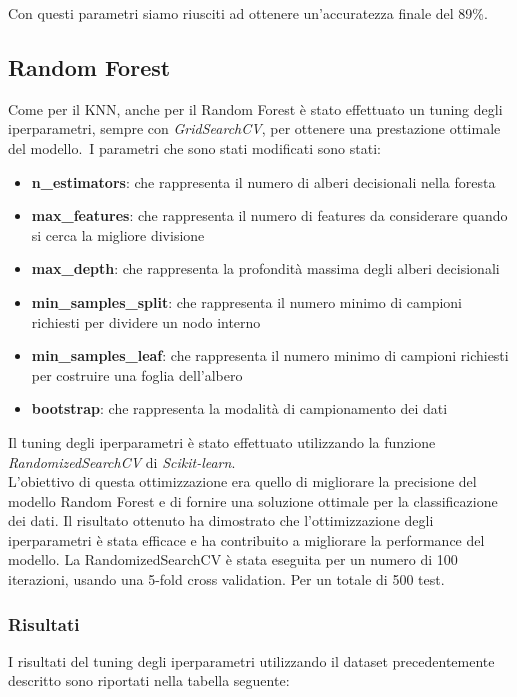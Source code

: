 \documentclass[../../Report.tex]{subfiles}
\begin{document}
Con questi parametri siamo riusciti ad ottenere un'accuratezza finale del 89\%.\\

\subsection{Random Forest}
Come per il KNN, anche per il Random Forest è stato effettuato un tuning degli iperparametri, sempre con \emph{GridSearchCV}, per ottenere una prestazione ottimale del modello.\
I parametri che sono stati modificati sono stati:
\begin{itemize}
\item \textbf{n\_estimators}: che rappresenta il numero di alberi decisionali nella foresta
\item \textbf{max\_features}: che rappresenta il numero di features da considerare quando si cerca la migliore divisione
\item \textbf{max\_depth}: che rappresenta la profondità massima degli alberi decisionali
\item \textbf{min\_samples\_split}: che rappresenta il numero minimo di campioni richiesti per dividere un nodo interno
\item \textbf{min\_samples\_leaf}: che rappresenta il numero minimo di campioni richiesti per costruire una foglia dell'albero
\item \textbf{bootstrap}: che rappresenta la modalità di campionamento dei dati
\end{itemize}
Il tuning degli iperparametri è stato effettuato utilizzando la funzione \emph{RandomizedSearchCV} di \emph{Scikit-learn}.\\
L'obiettivo di questa ottimizzazione era quello di migliorare la precisione del modello Random Forest e di fornire una soluzione ottimale per la classificazione dei dati. Il risultato ottenuto ha dimostrato che l'ottimizzazione degli iperparametri è stata efficace e ha contribuito a migliorare la performance del modello. La RandomizedSearchCV è stata eseguita per un numero di 100 iterazioni, usando una 5-fold cross validation. Per un totale di 500 test. 

\subsubsection{Risultati}

I risultati del tuning degli iperparametri utilizzando il dataset precedentemente descritto sono riportati nella tabella seguente:
\end{document}
